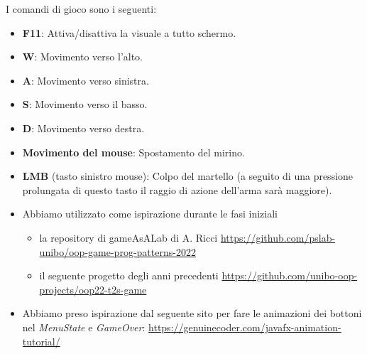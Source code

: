 \documentclass[a4paper,12pt]{report}
\begin{document}
I comandi di gioco sono i seguenti:
\begin{itemize}
    \item \textbf{F11}: Attiva/disattiva la visuale a tutto schermo.
    \item \textbf{W}: Movimento verso l'alto.
    \item \textbf{A}: Movimento verso sinistra.
    \item \textbf{S}: Movimento verso il basso.
    \item \textbf{D}: Movimento verso destra.
    \item \textbf{Movimento del mouse}: Spostamento del mirino.
    \item \textbf{LMB} (tasto sinistro mouse): Colpo del martello (a seguito di una pressione prolungata di questo tasto il raggio di azione dell'arma sarà maggiore).
\end{itemize}



\begin{itemize}
	\item Abbiamo utilizzato come ispirazione durante le fasi iniziali
    \begin{itemize}
        \item la repository di gameAsALab di A. Ricci \url{https://github.com/pslab-unibo/oop-game-prog-patterns-2022}
        \item il seguente progetto degli anni precedenti \url{https://github.com/unibo-oop-projects/oop22-t2s-game}
    \end{itemize}
    \item Abbiamo preso ispirazione dal seguente sito per fare le animazioni dei bottoni nel \emph{MenuState} e \emph{GameOver}: \url{https://genuinecoder.com/javafx-animation-tutorial/}
\end{itemize}
\end{document}
